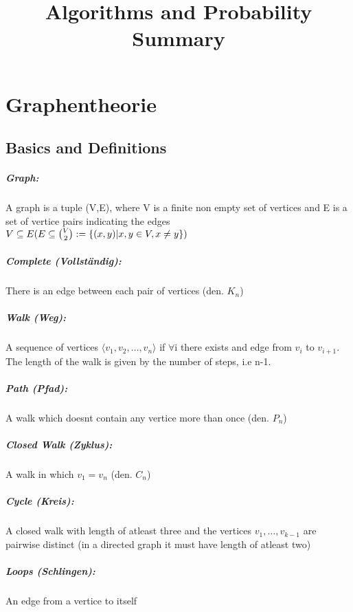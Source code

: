 \documentclass[8pt]{extreport}
\title{Algorithms and Probability\\ Summary}
\begin{document}
	\maketitle
	\newpage
\chapter{Graphentheorie}
\section{Basics and Definitions}
\paragraph{Graph:}
A graph is a tuple (V,E), where V is a finite non empty set of vertices and E is a set of vertice pairs indicating the edges $V \subseteq E\\ (E \subseteq \binom{V}{2} := \{(x,y)|x,y \in V, x\neq y\}) $
\paragraph{Complete (Vollständig):}
There is an edge between each pair of vertices (den. $K_{n}$)
\paragraph{Walk (Weg):} A sequence of vertices $ \langle v_{1},v_{2},\dots,v_{n} \rangle$ if $\forall$i there exists and edge from $v_{i}$ to $v_{i+1}$. The length of the walk is given by the number of steps, i.e n-1.
\paragraph{Path (Pfad):} A walk which doesnt contain any vertice more than once (den. $P_{n}$)
\paragraph{Closed Walk (Zyklus):} A walk in which $v_{1} = v_{n}$ (den. $C_{n}$)
\paragraph{Cycle (Kreis):} A closed walk with length of atleast three and the vertices $v_{1},\dots,v_{k-1}$ are pairwise distinct (in a directed graph it must have length of atleast two)
\paragraph{Loops (Schlingen):} An edge from a vertice to itself
\end{document}
